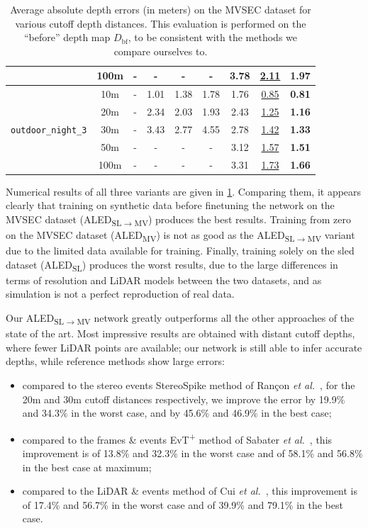 \begin{table}[ht]
{\begin{tabular}{@{}l c c cc cccc@{}}
      & 100m & - & - & - & - & 3.78 & \underline{2.11} & \textbf{1.97} \\
      \midrule
      \multirow{5}{*}{\Verb|outdoor_night_3|} & 10m & - & 1.01 & 1.38 & 1.78 & 1.76 & \underline{0.85} & \textbf{0.81} \\
      & 20m & - & 2.34 & 2.03 & 1.93 & 2.43 & \underline{1.25} & \textbf{1.16} \\
      & 30m & - & 3.43 & 2.77 & 4.55 & 2.78 & \underline{1.42} & \textbf{1.33} \\
      & 50m & - & - & - & - & 3.12 & \underline{1.57} & \textbf{1.51} \\
      & 100m & - & - & - & - & 3.31 & \underline{1.73} & \textbf{1.66} \\
      \bottomrule
    \end{tabular}
  }
  \caption{Average absolute depth errors (in meters) on the MVSEC dataset for various cutoff depth distances. This evaluation is performed on the ``before'' depth map \(D_\text{bf}\), to be consistent with the methods we compare ourselves to.}\label{tab:aled:results_mvsec}
\end{table}

Numerical results of all three variants are given in \cref{tab:aled:results_mvsec}. Comparing them, it appears clearly that training on synthetic data before finetuning the network on the MVSEC dataset (ALED\textsubscript{SL\(\rightarrow\)MV}) produces the best results. Training from zero on the MVSEC dataset (ALED\textsubscript{MV}) is not as good as the ALED\textsubscript{SL\(\rightarrow\)MV} variant due to the limited data available for training. Finally, training solely on the \acrshort{sled} dataset (ALED\textsubscript{SL}) produces the worst results, due to the large differences in terms of resolution and LiDAR models between the two datasets, and as simulation is not a perfect reproduction of real data.

Our ALED\textsubscript{SL\(\rightarrow\)MV} network greatly outperforms all the other approaches of the state of the art. Most impressive results are obtained with distant cutoff depths, where fewer LiDAR points are available; our network is still able to infer accurate depths, while reference methods show large errors:
\begin{itemize}
  \item compared to the stereo events StereoSpike method of Rançon \textit{et al.}~\cite{Ranon2021StereoSpikeDL}, for the 20m and 30m cutoff distances respectively, we improve the error by 19.9\% and 34.3\% in the worst case, and by 45.6\% and 46.9\% in the best case;
  \item compared to the frames \& events EvT\textsuperscript{+} method of Sabater \textit{et al.}~\cite{Sabater2022EventTA+}, this improvement is of 13.8\% and 32.3\% in the worst case and of 58.1\% and 56.8\% in the best case at maximum;
  \item compared to the LiDAR \& events method of Cui \textit{et al.}~\cite{Cui2022DenseDE}, this improvement is of 17.4\% and 56.7\% in the worst case and of 39.9\% and 79.1\% in the best case.
\end{itemize}

